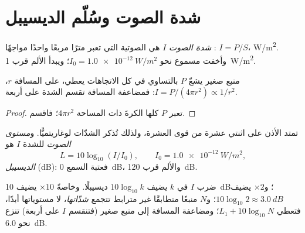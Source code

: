 \section{شدة الصوت وسُلّم الديسيبل}

\begin{definition}\label{def:g12:sound-acoustics:intensity}
\emph{شدة الصوت} $I$ هي
 الصوتية التي تعبر مترًا مربعًا واحدًا مواجهًا :
$I = P/S$،  \unit{W/m^2}. وأخفت  مسموع نحو
$I_0 = \qty{1.0e-12}{W/m^2}$؛ ويبدأ الألم قرب \qty{1}{W/m^2}.
\end{definition}

\begin{proposition}\label{prop:g12:sound-acoustics:inverse-square}
%
منبع صغير يشعّ  $P$ بالتساوي في كل الاتجاهات
يعطي، على المسافة $r$، $I = P/(4\pi r^2) \propto 1/r^2$: فمضاعفة
المسافة تقسم الشدة على أربعة.
\end{proposition}

\begin{proof}
تعبر  $P$ كلها الكرةَ ذات المساحة $4\pi r^2$؛ فاقسم.
\end{proof}

\begin{definition}\label{def:g12:sound-acoustics:level}
تمتد الأذن على اثنتي عشرة  من قوى العشرة، ولذلك تُذكر الشدّات
لوغاريتميًّا. و\emph{مستوى الصوت} للشدة $I$ هو
\[ L = 10 \log_{10}(I/I_0), \qquad I_0 = \qty{1.0e-12}{W/m^2}, \]
 \emph{الديسيبل} (\unit{dB}): فعتبة السمع
\qty{0}{dB}، والألم قرب \qty{120}{dB}.
\end{definition}

\begin{proposition}\label{prop:g12:sound-acoustics:db-arithmetic}
ضرب $I$ في $k$ يضيف $10\log_{10}k$ ديسيبلًا. وخاصةً
$\times 10$ يضيف \qty{10}{dB}؛ و$\times 2$ يضيف
$10\log_{10}2 \approx \qty{3.0}{dB}$؛ و$N$ منبعًا متطابقًا غير مترابط تتجمع
\emph{شدّاتها}، لا مستوياتها أبدًا، فتعطي
$L_1 + 10\log_{10}N$؛ ومضاعفة المسافة إلى منبع صغير (فتنقسم $I$
على أربعة) تنزع نحو \qty{6.0}{dB}.
\end{proposition}

